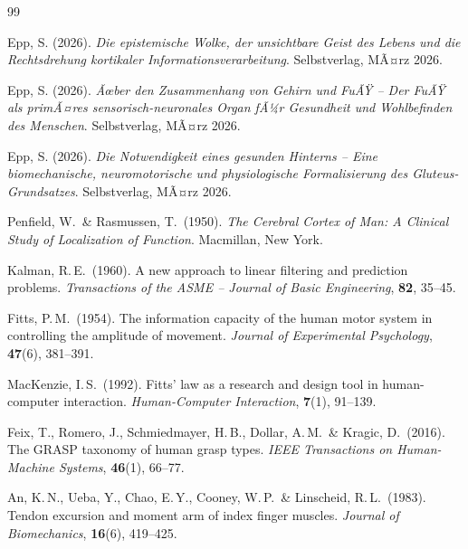 ﻿\documentclass[12pt,a4paper]{report}
\theoremstyle{plain}
\theoremstyle{definition}
\theoremstyle{remark}
\begin{document}
\begin{thebibliography}{99}

Epp, S. (2026). \emph{Die epistemische Wolke, der unsichtbare Geist des
Lebens und die Rechtsdrehung kortikaler Informationsverarbeitung}.
Selbstverlag, MÃ¤rz 2026.

Epp, S. (2026). \emph{Ãœber den Zusammenhang von Gehirn und FuÃŸ --
Der FuÃŸ als primÃ¤res sensorisch-neuronales Organ fÃ¼r Gesundheit und
Wohlbefinden des Menschen}. Selbstverlag, MÃ¤rz 2026.

Epp, S. (2026). \emph{Die Notwendigkeit eines gesunden Hinterns --
Eine biomechanische, neuromotorische und physiologische Formalisierung
des Gluteus-Grundsatzes}. Selbstverlag, MÃ¤rz 2026.

Penfield, W.\ \& Rasmussen, T.\ (1950). \emph{The Cerebral Cortex
of Man: A Clinical Study of Localization of Function}. Macmillan, New York.

Kalman, R.\,E.\ (1960). A new approach to linear filtering and prediction
problems. \emph{Transactions of the ASME -- Journal of Basic Engineering},
\textbf{82}, 35--45.

Fitts, P.\,M.\ (1954). The information capacity of the human motor system
in controlling the amplitude of movement. \emph{Journal of Experimental
Psychology}, \textbf{47}(6), 381--391.

MacKenzie, I.\,S.\ (1992). Fitts' law as a research and design tool in
human-computer interaction. \emph{Human-Computer Interaction}, \textbf{7}(1),
91--139.

Feix, T., Romero, J., Schmiedmayer, H.\,B., Dollar, A.\,M.\ \&
Kragic, D.\ (2016). The GRASP taxonomy of human grasp types.
\emph{IEEE Transactions on Human-Machine Systems}, \textbf{46}(1), 66--77.

An, K.\,N., Ueba, Y., Chao, E.\,Y., Cooney, W.\,P.\ \& Linscheid, R.\,L.\
(1983). Tendon excursion and moment arm of index finger muscles.
\emph{Journal of Biomechanics}, \textbf{16}(6), 419--425.


\end{thebibliography}
\end{document}
